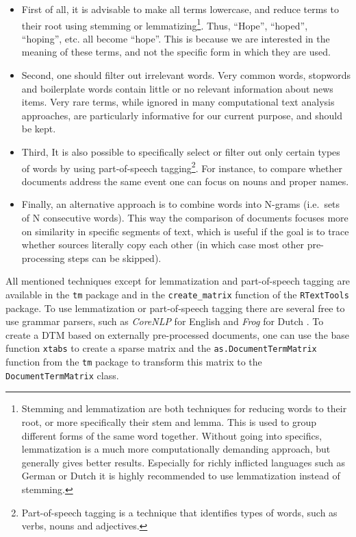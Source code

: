 \begin{itemize}
\item
  First of all, it is advisable to make all terms lowercase, and reduce
  terms to their root using stemming or lemmatizing\footnote{Stemming
    and lemmatization are both techniques for reducing words to their
    root, or more specifically their stem and lemma. This is used to
    group different forms of the same word together. Without going into
    specifics, lemmatization is a much more computationally demanding
    approach, but generally gives better results. Especially for richly
    inflicted languages such as German or Dutch it is highly recommended
    to use lemmatization instead of stemming.}. Thus, ``Hope'',
  ``hoped'', ``hoping'', etc. all become ``hope''. This is because we
  are interested in the meaning of these terms, and not the specific
  form in which they are used.
\item
  Second, one should filter out irrelevant words. Very common words,
  stopwords and boilerplate words contain little or no relevant
  information about news items. Very rare terms, while ignored in many
  computational text analysis approaches, are particularly informative
  for our current purpose, and should be kept.
\item
  Third, It is also possible to specifically select or filter out only
  certain types of words by using part-of-speech tagging\footnote{Part-of-speech
    tagging is a technique that identifies types of words, such as
    verbs, nouns and adjectives.}. For instance, to compare whether
  documents address the same event one can focus on nouns and proper
  names.
\item
  Finally, an alternative approach is to combine words into N-grams
  (i.e.~sets of N consecutive words). This way the comparison of
  documents focuses more on similarity in specific segments of text,
  which is useful if the goal is to trace whether sources literally copy
  each other (in which case most other pre-processing steps can be
  skipped).
\end{itemize}

All mentioned techniques except for lemmatization and part-of-speech
tagging are available in the \texttt{tm} package and in the
\texttt{create\_matrix} function of the \texttt{RTextTools} package. To
use lemmatization or part-of-speech tagging there are several free to
use grammar parsers, such as \emph{CoreNLP} for English \citep{corenlp}
and \emph{Frog} for Dutch \citep{bosch07}. To create a DTM based on
externally pre-processed documents, one can use the base function
\texttt{xtabs} to create a sparse matrix and the
\texttt{as.DocumentTermMatrix} function from the \texttt{tm} package to
transform this matrix to the \texttt{DocumentTermMatrix} class.

